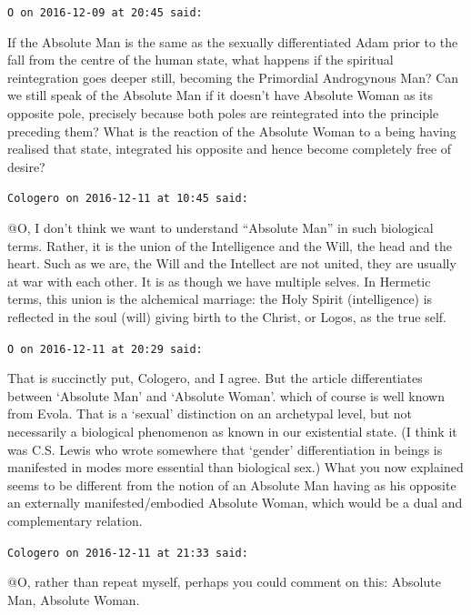 \begin{footnotesize}\begin{sffamily}



\texttt{O on 2016-12-09 at 20:45 said: }

If the Absolute Man is the same as the sexually differentiated Adam prior to the fall from the centre of the human state, what happens if the spiritual reintegration goes deeper still, becoming the Primordial Androgynous Man? Can we still speak of the Absolute Man if it doesn't have Absolute Woman as its opposite pole, precisely because both poles are reintegrated into the principle preceding them? What is the reaction of the Absolute Woman to a being having realised that state, integrated his opposite and hence become completely free of desire?


\hfill

\texttt{Cologero on 2016-12-11 at 10:45 said: }

@O, I don't think we want to understand “Absolute Man” in such biological terms. Rather, it is the union of the Intelligence and the Will, the head and the heart. Such as we are, the Will and the Intellect are not united, they are usually at war with each other. It is as though we have multiple selves. In Hermetic terms, this union is the alchemical marriage: the Holy Spirit (intelligence) is reflected in the soul (will) giving birth to the Christ, or Logos, as the true self.


\hfill

\texttt{O on 2016-12-11 at 20:29 said: }

That is succinctly put, Cologero, and I agree. But the article differentiates between `Absolute Man' and `Absolute Woman'. which of course is well known from Evola. That is a `sexual' distinction on an archetypal level, but not necessarily a biological phenomenon as known in our existential state. (I think it was C.S. Lewis who wrote somewhere that `gender' differentiation in beings is manifested in modes more essential than biological sex.) What you now explained seems to be different from the notion of an Absolute Man having as his opposite an externally manifested/embodied Absolute Woman, which would be a dual and complementary relation.


\hfill

\texttt{Cologero on 2016-12-11 at 21:33 said: }

@O, rather than repeat myself, perhaps you could comment on this: Absolute Man, Absolute Woman.


\end{sffamily}
\end{footnotesize}
